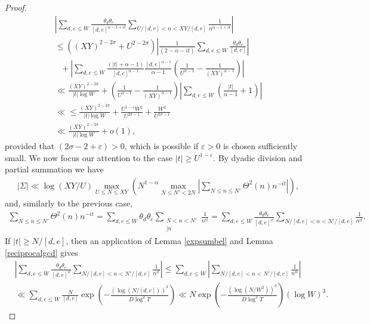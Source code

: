 \documentclass[reqno]{amsart}
\numberwithin{equation}{section}
\theoremstyle{remark}
\begin{document}
\begin{proof}
\begin{equation}
    \begin{aligned}
   & \left|\sum_{d,e\le W}\frac{\theta_d\theta_e}{[d,e]^{\alpha-1+it}}\sum_{U/[d,e]<n<XY/[d,e]}\frac{1}{n^{\alpha-1+it}}\right|\\&\le \left((XY)^{2-2\sigma}+U^{2-2\sigma}\right)\left|\frac{1}{(2-\alpha-i t)}\sum_{d,e\le W}\frac{\theta_d\theta_e}{[d,e]} \right|\\&\ \ \  +\left|\sum_{d,e\le W}\frac{(|t|+\alpha-1)}{[d,e]^{\alpha-1}}\frac{[d,e]^{\alpha-1}}{\alpha-1}\left(\frac{1}{U^{\alpha-1}}-\frac{1}{(XY)^{\alpha-1}}\right)\right|\\
    &\ll \frac{(XY)^{2-2\sigma}}{|t|\log W}+\left(\frac{1}{U^{\alpha-1}}-\frac{1}{(XY)^{\alpha-1}}\right)\left|\sum_{d,e\le W}\left(\frac{|t|}{\alpha-1}+1\right)\right|\\
    &\ll \le \frac{(XY)^{2-2\sigma}}{|t|\log W}+\frac{U^{1-\varepsilon}W^2}{U^{2\sigma-1}}+\frac{W^2}{U^{2\sigma-1}}\\
    &\ll\frac{(XY)^{2-2\sigma}}{|t|\log W}+o(1),
\end{aligned}
\end{equation}
provided that $(2\sigma-2+\varepsilon)>0$, which is possible if $\varepsilon>0$ is chosen sufficiently small.
We now focus our attention to the case $|t|\ge U^{1-\varepsilon}$. By dyadic division and partial summation we have
\begin{align*}
    & \left|\Sigma\right|\ll \log(XY/U)\max_{U\le N\le XY}\left(N^{1-\alpha}\max_{N\le N'<2N}\left|\sum_{N\le n\le N'}\Theta^2(n)n^{-it}\right|\right),
\end{align*}
and, similarly to the previous case,
\begin{align*}
   \sum_{N\le n\le N'}\Theta^2(n)n^{-it}=\sum_{d,e\le W}\theta_d\theta_e\sum_{\substack{N<n<N'\\ [d,e]|n}}\frac{1}{n^{it}}=\sum_{d,e\le W}\frac{\theta_d\theta_e}{[d,e]^{it}}\sum_{N/[d,e]<n<N'/[d,e]}\frac{1}{n^{it}}.
\end{align*}
If $|t|\ge N/[d,e]$, then an application of Lemma \ref{expsumbel} and Lemma \ref{reciprocalgcd} gives
    \begin{align*}
        &\left|\sum_{d,e\le W}\frac{\theta_d\theta_e}{[d,e]^{it}}\sum_{N/[d,e]<n<N'/[d,e]}\frac{1}{n^{it}}\right|\le \sum_{d,e\le W}\left|\sum_{N/[d,e]<n<N'/[d,e]}\frac{1}{n^{it}}\right|\\
        &\ll \sum_{d,e\le W} \frac{N}{[d,e]}\exp\left(-\frac{(\log(N/[d,e]))^3}{D\log^2T}\right)\ll  N \exp\left(-\frac{(\log(N/W^2))^3}{D\log^2T}\right) (\log W)^3.
        \end{align*}

\end{proof}
\end{document}
